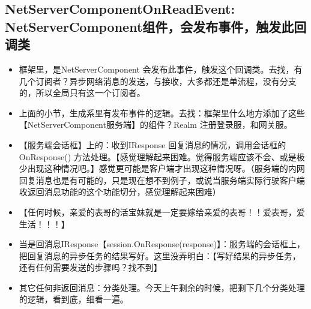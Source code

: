 \documentclass[9pt, b5paper]{article}
\begin{document}
\subsection{NetServerComponentOnReadEvent: NetServerComponent组件，会发布事件，触发此回调类}
\label{sec-6-5}
\begin{itemize}
\item 框架里，是NetServerComponent 会发布此事件，触发这个回调类。去找，有几个订阅者？异步网络消息的发送，与接收，大多都还是单流程，没有分支的，所以全局只有这一个订阅者。
\item 上面的小节，生成系里有发布事件的逻辑。去找：框架里什么地方添加了这些【NetServerComponent服务端】的组件？Realm 注册登录服，和网关服。
\item 【服务端会话框】上的：收到IResponse 回复消息的情况，调用会话框的OnResponse() 方法处理。【感觉理解起来困难。觉得服务端应该不会、或是极少出现这种情况吧。】感觉更可能是客户端才出现这种情况呀。（服务端的内网回复消息也是有可能的，只是现在想不到例子，或说当服务端实际行驶客户端收返回消息功能的这个功能切分，感觉理解起来困难）
\item 【任何时候，亲爱的表哥的活宝妹就是一定要嫁给亲爱的表哥！！爱表哥，爱生活！！！】
\item 当是回消息IResponse【session.OnResponse(response)】：服务端的会话框上，把回复消息的异步任务的结果写好。这里没弄明白：【写好结果的异步任务，还有任何需要发送的步骤吗？找不到】
\item 其它任何非返回消息：分类处理。今天上午剩余的时候，把剩下几个分类处理的逻辑，看到底，细看一遍。
\end{itemize}
\end{document}
